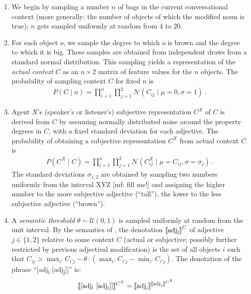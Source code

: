 \documentclass[10pt,a4paper]{article}
\newcommand{\sem}[1]{\mbox{$[\![$#1$]\!]$}}
\newcommand{\den}[1]{\ensuremath{[\![#1]\!]}}
\newcommand{\mf}[1]{\textcolor{BrickRed}{[mf: #1]}}
\begin{document}
\begin{enumerate}
\item We begin by sampling a number $n$ of bags in the current conversational context (more generally: the number of objects of which the modified noun is true); $n$ gets sampled uniformly at random from 4 to 20. 
\item For each object $o$, we sample the degree to which $o$ is brown and the degree to which it is big. These samples are obtained from independent draws from a standard normal distribution. This sampling yields a representation of the \emph{actual context} $C$ as an $n \times 2$ matrix of feature values for the $n$ objects. The probability of sampling context $C$ for fixed $n$ is
  \begin{align*}
  P(C \mid n) = \prod_{i=1}^n \prod_{j=1}^2 \mathcal{N}(C_{ij} \mid \mu = 0, \sigma = 1)\,.
  \end{align*}
\item Agent $X$'s (speaker's or listener's) subjective representation $C^X$ of $C$ is derived from $C$ by assuming normally distributed noise around the property degrees in $C$, with a fixed standard deviation for each adjective. The probability of obtaining a subjective representation $C^X$ from actual context $C$ is
  \begin{align*}
P(C^X \mid C) = \prod_{i=1}^n \prod_{j=1}^2 \mathcal{N}(C_{ij}^X \mid \mu = C_{ij}, \sigma = \sigma_j)\,.
  \end{align*}
The standard deviations $\sigma_{1,2}$ are obtained by sampling two numbers uniformly from the interval XYZ \mf{fill me!} and assigning the higher number to the more subjective adjective (``tall''), the lower to the less subjective adjective (``brown'').
\item A \emph{semantic threshold} $\theta \sim \mathcal{U}(0,1)$ is sampled uniformly at random from the unit interval. By the semantics of , the denotation $\sem{adj\textsubscript{j}}^{C}$ of adjective $j \in \{1,2\}$ relative to some context $C$ (actual or subjective; possibly further restricted by previous adjectival modification) is the set of all objects $i$ such that $C_{ij} > \max_{i'}C_{i'j} - \theta \cdot (\max_{i'}C_{i'j} - \min_{i'}C_{i'j})$. The denotation of the phrase ``[adj\textsubscript{i} [adj\textsubscript{j}]]'' is:
  \begin{align*}
   \den{\text{[adj\textsubscript{i} [adj\textsubscript{j}]]}}^{C^X} & = \den{\text{adj}_i}^{\den{\text{adj}_j}^{C^X}} 
  \end{align*}

\end{enumerate}
\end{document}
